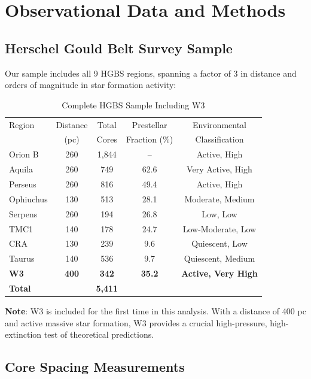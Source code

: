 \documentclass[11pt,a4paper]{article}
\begin{document}
\section{Observational Data and Methods}

\subsection{Herschel Gould Belt Survey Sample}

Our sample includes all 9 HGBS regions, spanning a factor of 3 in distance and orders of magnitude in star formation activity:

\begin{table}[H]
\centering
\caption{Complete HGBS Sample Including W3}
\begin{tabular}{lcccc}
\toprule
Region & Distance & Total & Prestellar & Environmental \\
       & (pc)   & Cores & Fraction (\%) & Classification \\
\midrule
Orion B  & 260     & 1,844 & --       & Active, High \\
Aquila   & 260     & 749   & 62.6     & Very Active, High \\
Perseus  & 260     & 816   & 49.4     & Active, High \\
Ophiuchus& 130     & 513   & 28.1     & Moderate, Medium \\
Serpens  & 260     & 194   & 26.8     & Low, Low \\
TMC1     & 140     & 178   & 24.7     & Low-Moderate, Low \\
CRA      & 130     & 239   & 9.6      & Quiescent, Low \\
Taurus   & 140     & 536   & 9.7      & Quiescent, Medium \\
\textbf{W3}      & \textbf{400}     & \textbf{342}   & \textbf{35.2}     & \textbf{Active, Very High} \\
\midrule
\textbf{Total} &        & \textbf{5,411} &        &  \\
\bottomrule
\end{tabular}
\end{table}

\noindent\textbf{Note}: W3 is included for the first time in this analysis. With a distance of 400 pc and active massive star formation, W3 provides a crucial high-pressure, high-extinction test of theoretical predictions.

\subsection{Core Spacing Measurements}
\end{document}

